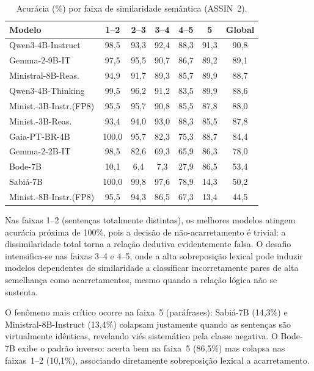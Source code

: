 \documentclass[12pt]{article}
\begin{document}
\begin{table}[htbp]
\centering
\caption{Acurácia (\%) por faixa de similaridade semântica (ASSIN~2).}
\label{tab:catsim}
\begin{tabular}{lcccccc}
\toprule
\textbf{Modelo} & \textbf{1--2} & \textbf{2--3} & \textbf{3--4} & \textbf{4--5}
                & \textbf{5} & \textbf{Global} \\
\midrule
Qwen3-4B-Instruct      & 98,5  & 93,3 & 92,4 & 88,3 & 91,3 & 90,8 \\
Gemma-2-9B-IT          & 97,5  & 95,5 & 90,7 & 86,7 & 89,2 & 89,1 \\
Ministral-8B-Reas.     & 94,9  & 91,7 & 89,3 & 85,7 & 89,9 & 88,7 \\
Qwen3-4B-Thinking      & 99,5  & 96,2 & 91,2 & 83,5 & 89,9 & 88,6 \\
Minist.-3B-Instr.(FP8) & 95,5  & 95,7 & 90,8 & 85,5 & 87,8 & 88,0 \\
Minist.-3B-Reas.       & 93,4  & 94,0 & 93,0 & 88,3 & 85,5 & 87,8 \\
Gaia-PT-BR-4B          & 100,0 & 95,7 & 82,3 & 75,3 & 88,7 & 84,4 \\
Gemma-2-2B-IT          & 98,5  & 82,6 & 69,3 & 65,9 & 86,3 & 78,0 \\
Bode-7B                & 10,1  & 6,4  & 7,3  & 27,9 & 86,5 & 53,4 \\
Sabiá-7B               & 100,0 & 99,8 & 97,6 & 78,9 & 14,3 & 50,2 \\
Minist.-8B-Instr.(FP8) & 95,5  & 94,3 & 86,5 & 67,3 & 13,4 & 44,5 \\
\bottomrule
\end{tabular}
\end{table}

Nas faixas 1--2 (sentenças totalmente distintas), os melhores modelos atingem
acurácia próxima de 100\%, pois a decisão de não-acarretamento é trivial: a
dissimilaridade total torna a relação dedutiva evidentemente falsa. O desafio
intensifica-se nas faixas 3--4 e 4--5, onde a alta sobreposição lexical pode
induzir modelos dependentes de similaridade a classificar incorretamente pares
de alta semelhança como acarretamentos, mesmo quando a relação lógica não se
sustenta.

O fenômeno mais crítico ocorre na faixa~5 (paráfrases): Sabiá-7B (14,3\%) e
Ministral-8B-Instruct (13,4\%) colapsam justamente quando as sentenças são
virtualmente idênticas, revelando viés sistemático pela classe negativa. O
Bode-7B exibe o padrão inverso: acerta bem na faixa~5 (86,5\%) mas colapsa nas
faixas~1--2 (10,1\%), associando diretamente sobreposição lexical a
acarretamento.
\end{document}
